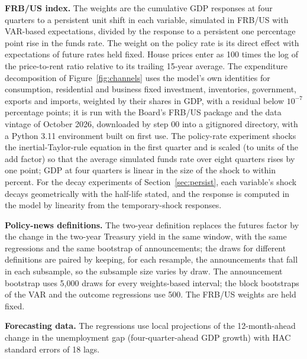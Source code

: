 \documentclass[11pt]{article}
\begin{document}
\begin{appendices}
\textbf{FRB/US index.} The weights are the cumulative GDP responses at four quarters to a persistent unit shift in each variable, simulated in FRB/US with VAR-based expectations, divided by the response to a persistent one percentage point rise in the funds rate. The weight on the policy rate is its direct effect with expectations of future rates held fixed. House prices enter as 100 times the log of the price-to-rent ratio relative to its trailing 15-year average. The expenditure decomposition of Figure~\ref{fig:channels} uses the model's own identities for consumption, residential and business fixed investment, inventories, government, exports and imports, weighted by their shares in GDP, with a residual below $10^{-7}$ percentage points; it is run with the Board's FRB/US package and the data vintage of October 2026, downloaded by step 00 into a gitignored directory, with a Python 3.11 environment built on first use. The policy-rate experiment shocks the inertial-Taylor-rule equation in the first quarter and is scaled (to  units of the add factor) so that the average simulated funds rate over eight quarters rises by one point; GDP at four quarters is linear in the size of the shock to within  percent. For the decay experiments of Section~\ref{sec:persist}, each variable's shock decays geometrically with the half-life stated, and the response is computed in the model by linearity from the temporary-shock responses.

\textbf{Policy-news definitions.} The two-year definition replaces the futures factor by the change in the two-year Treasury yield in the same window, with the same regressions and the same bootstrap of announcements; the draws for different definitions are paired by keeping, for each resample, the announcements that fall in each subsample, so the subsample size varies by draw. The announcement bootstrap uses 5,000 draws for every weights-based interval; the block bootstraps of the VAR and the outcome regressions use 500. The FRB/US weights are held fixed.

\textbf{Forecasting data.} The regressions use local projections of the 12-month-ahead change in the unemployment gap (four-quarter-ahead GDP growth) with HAC standard errors of 18 lags.


\end{appendices}
\end{document}
